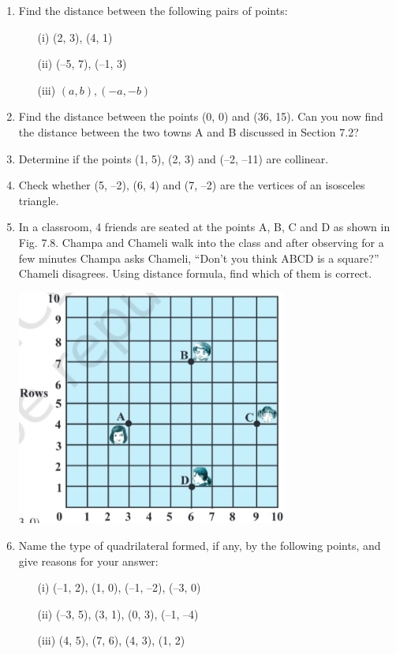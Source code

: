 \documentclass[a4paper,12pt]{article}
\begin{document}
\begin{enumerate}
    \item Find the distance between the following pairs of points:
    \begin{itemize}
        \item[(i)] (2, 3), (4, 1)
        \item[(ii)] (–5, 7), (–1, 3)
        \item[(iii)] $(a, b), (-a, -b)$
    \end{itemize}

    \item Find the distance between the points (0, 0) and (36, 15). Can you now find the distance between the two towns A and B discussed in Section 7.2?

    \item Determine if the points (1, 5), (2, 3) and (–2, –11) are collinear.

    \item Check whether (5, –2), (6, 4) and (7, –2) are the vertices of an isosceles triangle.

    \item In a classroom, 4 friends are seated at the points A, B, C and D as shown in Fig. 7.8. Champa and Chameli walk into the class and after observing for a few minutes Champa asks Chameli, “Don’t you think ABCD is a square?” Chameli disagrees. Using distance formula, find which of them is correct.

    \begin{center}
        \includegraphics[width=0.7\textwidth]{cat.png} %
    \end{center}

    \item Name the type of quadrilateral formed, if any, by the following points, and give reasons for your answer:
    \begin{itemize}
        \item[(i)] (–1, 2), (1, 0), (–1, –2), (–3, 0)
        \item[(ii)] (–3, 5), (3, 1), (0, 3), (–1, –4)
        \item[(iii)] (4, 5), (7, 6), (4, 3), (1, 2)
    \end{itemize}


\end{enumerate}
\end{document}
